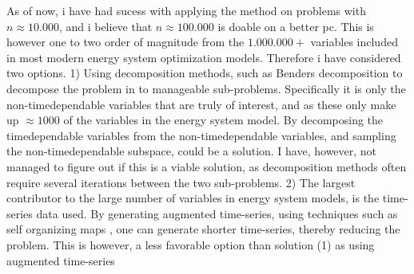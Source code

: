 \documentclass[11pt,a4paper,english]{article}
\begin{document}
As of now, i have had sucess with applying the method on problems with $n\approx 10.000$, and i believe that $n\approx 100.000$ is doable on a better pc. This is however one to two order of magnitude from the $1.000.000+$ variables included in most modern energy system optimization models. Therefore i have considered two options. 1) Using decomposition methods, such as Benders decomposition to decompose the problem in to manageable sub-problems. Specifically it is only the non-timedependable variables that are truly of interest, and as these only make up $\approx 1000$ of the variables in the energy system model. By decomposing the timedependable variables from the non-timedependable variables, and sampling the non-timedependable subspace, could be a solution. I have, however, not managed to figure out if this is a viable solution, as decomposition methods often require several iterations between the two sub-problems.  
2) The largest contributor to the large number of variables in energy system models, is the time-series data used. By generating augmented time-series, using techniques such as self organizing maps \cite{Hasan2019}, one can generate shorter time-series, thereby reducing the problem. This is however, a less favorable option than solution (1) as using augmented time-series 

\clearpage
\printbibliography
\end{document}
